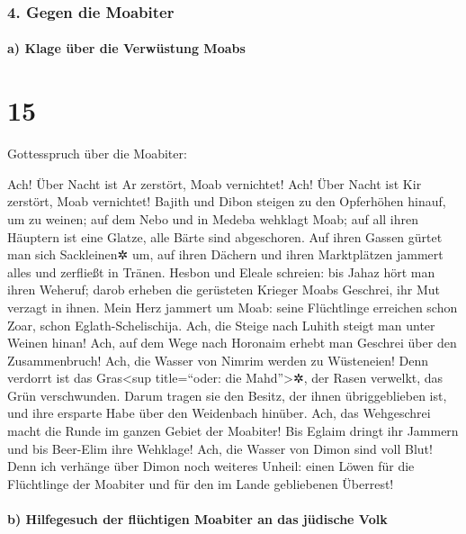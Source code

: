 \hypertarget{gegen-die-moabiter}{%
\subsubsection{4. Gegen die Moabiter}\label{gegen-die-moabiter}}

\hypertarget{a-klage-uxfcber-die-verwuxfcstung-moabs}{%
\paragraph{a) Klage über die Verwüstung
Moabs}\label{a-klage-uxfcber-die-verwuxfcstung-moabs}}

\hypertarget{section-14}{%
\section{15}\label{section-14}}

Gottesspruch über die Moabiter:

Ach! Über Nacht ist Ar zerstört, Moab vernichtet! Ach! Über Nacht ist
Kir zerstört, Moab vernichtet! Bajith und Dibon steigen zu
den Opferhöhen hinauf, um zu weinen; auf dem Nebo und in Medeba wehklagt
Moab; auf all ihren Häuptern ist eine Glatze, alle Bärte sind
abgeschoren. Auf ihren Gassen gürtet man sich Sackleinen✲
um, auf ihren Dächern und ihren Marktplätzen jammert alles und zerfließt
in Tränen. Hesbon und Eleale schreien: bis Jahaz hört man
ihren Weheruf; darob erheben die gerüsteten Krieger Moabs Geschrei, ihr
Mut verzagt in ihnen. Mein Herz jammert um Moab: seine
Flüchtlinge erreichen schon Zoar, schon Eglath-Schelischija. Ach, die
Steige nach Luhith steigt man unter Weinen hinan! Ach, auf dem Wege nach
Horonaim erhebt man Geschrei über den Zusammenbruch! Ach,
die Wasser von Nimrim werden zu Wüsteneien! Denn verdorrt ist das
Gras\textless sup title=``oder: die Mahd''\textgreater✲, der Rasen
verwelkt, das Grün verschwunden. Darum tragen sie den
Besitz, der ihnen übriggeblieben ist, und ihre ersparte Habe über den
Weidenbach hinüber. Ach, das Wehgeschrei macht die Runde
im ganzen Gebiet der Moabiter! Bis Eglaim dringt ihr Jammern und bis
Beer-Elim ihre Wehklage! Ach, die Wasser von Dimon sind
voll Blut! Denn ich verhänge über Dimon noch weiteres Unheil: einen
Löwen für die Flüchtlinge der Moabiter und für den im Lande gebliebenen
Überrest!

\hypertarget{b-hilfegesuch-der-fluxfcchtigen-moabiter-an-das-juxfcdische-volk}{%
\paragraph{b) Hilfegesuch der flüchtigen Moabiter an das jüdische
Volk}\label{b-hilfegesuch-der-fluxfcchtigen-moabiter-an-das-juxfcdische-volk}}

